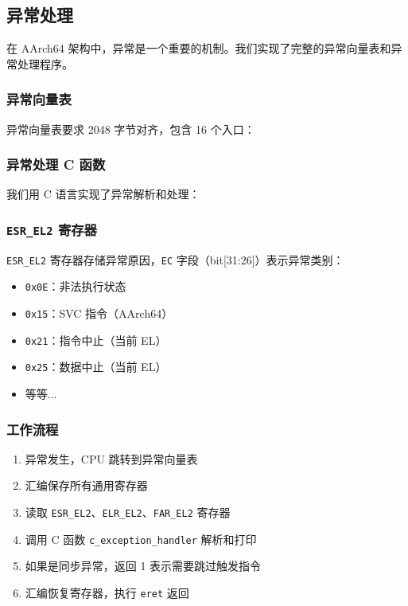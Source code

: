 
\subsection{异常处理}

在 AArch64 架构中，异常是一个重要的机制。我们实现了完整的异常向量表和异常处理程序。

\subsubsection{异常向量表}

异常向量表要求 2048 字节对齐，包含 16 个入口：



\subsubsection{异常处理 C 函数}

我们用 C 语言实现了异常解析和处理：



\subsubsection{\texttt{ESR\_EL2} 寄存器}

\texttt{ESR\_EL2} 寄存器存储异常原因，\texttt{EC} 字段（bit[31:26]）表示异常类别：

\begin{itemize}
    \item \texttt{0x0E}：非法执行状态
    \item \texttt{0x15}：SVC 指令（AArch64）
    \item \texttt{0x21}：指令中止（当前 EL）
    \item \texttt{0x25}：数据中止（当前 EL）
    \item 等等...
\end{itemize}

\subsubsection{工作流程}
\begin{enumerate}
    \item 异常发生，CPU 跳转到异常向量表
    \item 汇编保存所有通用寄存器
    \item 读取 \texttt{ESR\_EL2}、\texttt{ELR\_EL2}、\texttt{FAR\_EL2} 寄存器
    \item 调用 C 函数 \texttt{c\_exception\_handler} 解析和打印
    \item 如果是同步异常，返回 1 表示需要跳过触发指令
    \item 汇编恢复寄存器，执行 \texttt{eret} 返回
\end{enumerate}
